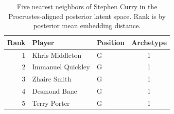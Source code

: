 \begin{table}[htbp]
  \centering\small
  \begin{tabular}{rllc}
    \toprule
    Rank & Player & Position & Archetype \\
    \midrule
    1 & Khris Middleton & G & 1 \\
    2 & Immanuel Quickley & G & 1 \\
    3 & Zhaire Smith & G & 1 \\
    4 & Desmond Bane & G & 1 \\
    5 & Terry Porter & G & 1 \\
    \bottomrule
  \end{tabular}
  \caption{Five nearest neighbors of Stephen Curry in the Procrustes-aligned posterior latent space. Rank is by posterior mean embedding distance.}
  \label{tab:Stephen_Curry_neighbors}
\end{table}

